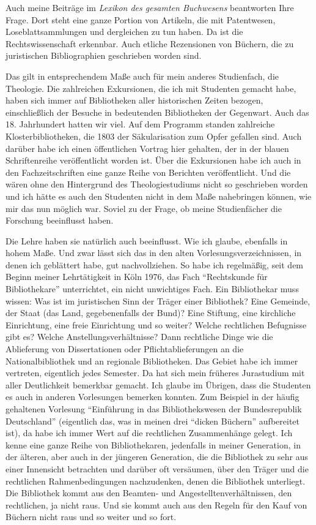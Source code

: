 \documentclass[a4paper,
fontsize=11pt,
oneside,
numbers=noperiodatend,
parskip=half-,
bibliography=totoc,
final
]{scrartcl}
\begin{document}
Auch meine Beiträge im \emph{Lexikon des gesamten Buchwesens}
beantworten Ihre Frage. Dort steht eine ganze Portion von Artikeln, die
mit Patentwesen, Loseblattsammlungen und dergleichen zu tun haben. Da
ist die Rechtswissenschaft erkennbar. Auch etliche Rezensionen von
Büchern, die zu juristischen Bibliographien geschrieben worden sind.

Das gilt in entsprechendem Maße auch für mein anderes Studienfach, die
Theologie. Die zahlreichen Exkursionen, die ich mit Studenten gemacht
habe, haben sich immer auf Bibliotheken aller historischen Zeiten
bezogen, einschließlich der Besuche in bedeutenden Bibliotheken der
Gegenwart. Auch das 18. Jahrhundert hatten wir viel. Auf dem Programm
standen zahlreiche Klosterbibliotheken, die 1803 der Säkularisation zum
Opfer gefallen sind. Auch darüber habe ich einen öffentlichen Vortrag
hier gehalten, der in der blauen Schriftenreihe veröffentlicht worden
ist. Über die Exkursionen habe ich auch in den Fachzeitschriften eine
ganze Reihe von Berichten veröffentlicht. Und die wären ohne den
Hintergrund des Theologiestudiums nicht so geschrieben worden und ich
hätte es auch den Studenten nicht in dem Maße nahebringen können, wie
mir das nun möglich war. Soviel zu der Frage, ob meine Studienfächer die
Forschung beeinflusst haben.

Die Lehre haben sie natürlich auch beeinflusst. Wie ich glaube,
ebenfalls in hohem Maße. Und zwar lässt sich das in den alten
Vorlesungsverzeichnissen, in denen ich geblättert habe, gut
nachvollziehen. So habe ich regelmäßig, seit dem Beginn meiner
Lehrtätigkeit in Köln 1976, das Fach \enquote{Rechtskunde für
Bibliothekare} unterrichtet, ein nicht unwichtiges Fach. Ein
Bibliothekar muss wissen: Was ist im juristischen Sinn der Träger einer
Bibliothek? Eine Gemeinde, der Staat (das Land, gegebenenfalls der
Bund)? Eine Stiftung, eine kirchliche Einrichtung, eine freie
Einrichtung und so weiter? Welche rechtlichen Befugnisse gibt es? Welche
Anstellungsverhältnisse? Dann rechtliche Dinge wie die Ablieferung von
Dissertationen oder Pflichtablieferungen an die Nationalbibliothek und
an regionale Bibliotheken. Das Gebiet habe ich immer vertreten,
eigentlich jedes Semester. Da hat sich mein früheres Jurastudium mit
aller Deutlichkeit bemerkbar gemacht. Ich glaube im Übrigen, dass die
Studenten es auch in anderen Vorlesungen bemerken konnten. Zum Beispiel
in der häufig gehaltenen Vorlesung \enquote{Einführung in das
Bibliothekswesen der Bundesrepublik Deutschland} (eigentlich das, was in
meinen drei \enquote{dicken Büchern} aufbereitet ist), da habe ich immer
Wert auf die rechtlichen Zusammenhänge gelegt. Ich kenne eine ganze
Reihe von Bibliothekaren, jedenfalls in meiner Generation, in der
älteren, aber auch in der jüngeren Generation, die die Bibliothek zu
sehr aus einer Innensicht betrachten und darüber oft versäumen, über den
Träger und die rechtlichen Rahmenbedingungen nachzudenken, denen die
Bibliothek unterliegt. Die Bibliothek kommt aus den Beamten- und
Angestelltenverhältnissen, den rechtlichen, ja nicht raus. Und sie kommt
auch aus den Regeln für den Kauf von Büchern nicht raus und so weiter
und so fort.
\end{document}
